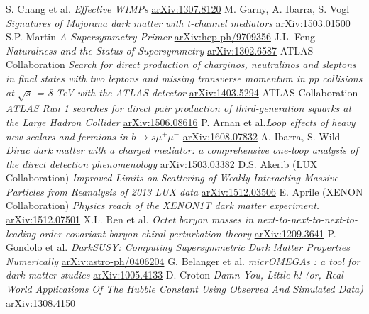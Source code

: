 \begin{thebibliography}{xxx}
 S. Chang et al. \textit{Effective WIMPs}  \href{https://arxiv.org/abs/1307.8120}{arXiv:1307.8120}
 M. Garny, A. Ibarra, S. Vogl \textit{Signatures of Majorana dark matter with t-channel mediators} \href{https://arxiv.org/abs/1503.01500}{arXiv:1503.01500}
 S.P. Martin \textit{A Supersymmetry Primer} \href{https://arxiv.org/abs/hep-ph/9709356}{arXiv:hep-ph/9709356}
 J.L. Feng  \textit{Naturalness and the Status of Supersymmetry} \href{https://arxiv.org/abs/1302.6587}{arXiv:1302.6587}
 ATLAS Collaboration \textit{Search for direct production of charginos, neutralinos and sleptons in final states with two leptons and missing transverse momentum in pp collisions at $\sqrt{s}$ = 8 TeV with the ATLAS detector} \href{https://arxiv.org/abs/1403.5294}{arXiv:1403.5294}
 ATLAS Collaboration \textit{ATLAS Run 1 searches for direct pair production of third-generation squarks at the Large Hadron Collider} \href{https://arxiv.org/abs/1506.08616}{arXiv:1506.08616}
 P. Arnan et al.\textit{Loop effects of heavy new scalars and fermions in $b\rightarrow s\mu^+\mu^-$} \href{https://arxiv.org/abs/1608.07832}{arXiv:1608.07832}
 A. Ibarra, S. Wild \textit{Dirac dark matter with a charged mediator: a comprehensive one-loop analysis of the direct detection phenomenology}  \href{https://arxiv.org/abs/1503.03382}{arXiv:1503.03382}
 D.S. Akerib (LUX Collaboration) \textit{Improved Limits on Scattering of Weakly Interacting Massive Particles from Reanalysis of 2013 LUX data} \href{https://arxiv.org/abs/1512.03506}{arXiv:1512.03506}
 E. Aprile (XENON Collaboration) \textit{Physics reach of the XENON1T dark matter experiment.} \href{https://arxiv.org/abs/1512.07501}{arXiv:1512.07501}
 X.L. Ren et al. \textit{Octet baryon masses in next-to-next-to-next-to-leading order covariant baryon chiral perturbation theory} \href{https://arxiv.org/abs/1209.3641}{arXiv:1209.3641}
 P. Gondolo et al. \textit{DarkSUSY: Computing Supersymmetric Dark Matter Properties Numerically} \href{https://arxiv.org/abs/astro-ph/0406204}{arXiv:astro-ph/0406204}
 G. Belanger et al. \textit{micrOMEGAs : a tool for dark matter studies} \href{https://arxiv.org/abs/1005.4133}{arXiv:1005.4133}
 D. Croton \textit{Damn You, Little h! (or, Real-World Applications Of The Hubble Constant Using Observed And Simulated Data)} \href{https://arxiv.org/abs/1308.4150}{arXiv:1308.4150}

\end{thebibliography}
